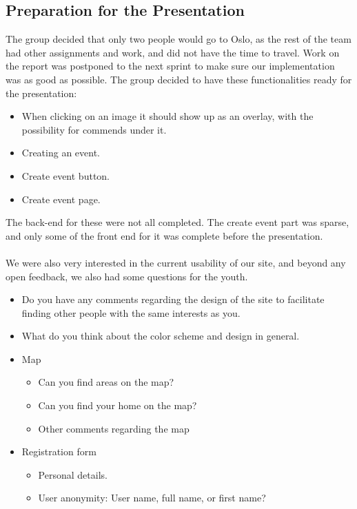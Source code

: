 \subsection{Preparation for the Presentation}
\label{subsec:S2PresentationPreparation}
The group decided that only two people would go to Oslo, as the rest of the team had other assignments and work, and did not have the time to travel. Work on the report was postponed to the next sprint to make sure our implementation was as good as possible. The group decided to have these functionalities ready for the presentation:

\begin{itemize}
  \item When clicking on an image it should show up as an overlay, with the possibility for commends under it.
  \item Creating an event.
  \item Create event button.
  \item Create event page.
\end{itemize} 

The back-end for these were not all completed. The create event part was sparse, and only some of the front end for it was complete before the presentation.

\paragraph{} We were also very interested in the current usability of our site, and beyond any open feedback, we also had some questions for the youth.

\begin{itemize}
  \item Do you have any comments regarding the design of the site to facilitate finding other people with the same interests as you.
  \item What do you think about the color scheme and design in general.
  \item Map
  \begin{itemize}
    \item Can you find areas on the map?
    \item Can you find your home on the map?
    \item Other comments regarding the map
  \end{itemize}
  \item Registration form
  \begin{itemize}
    \item Personal details.
    \item User anonymity: User name, full name, or first name?
  \end{itemize}
\end{itemize}

